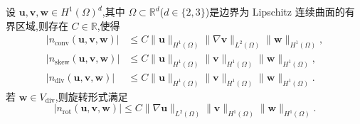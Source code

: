 \begin{lemma}[对流项的估计]\label{lem:steady-ns-convection-estimates-1}
设 $\bm{u},\bm{v},\bm{w}\in H^1(\Omega)^d$,其中 $\Omega\subset\mathbb{R}^d$($d\in\{2,3\}$)是边界为 Lipschitz 连续曲面的有界区域,则存在 $C\in\mathbb{R}$,使得
\begin{align}
  |n_{\mathrm{conv}}(\bm{u},\bm{v},\bm{w})|
    &\le C\|\bm{u}\|_{H^1(\Omega)}
       \|\nabla\bm{v}\|_{L^2(\Omega)}
       \|\bm{w}\|_{H^1(\Omega)},
       \label{eq:steady-ns-conv-estimate-29}\\
  |n_{\mathrm{skew}}(\bm{u},\bm{v},\bm{w})|
    &\le C\|\bm{u}\|_{H^1(\Omega)}
       \|\bm{v}\|_{H^1(\Omega)}
       \|\bm{w}\|_{H^1(\Omega)},
       \label{eq:steady-ns-conv-estimate-30}\\
  |n_{\mathrm{div}}(\bm{u},\bm{v},\bm{w})|
    &\le C\|\bm{u}\|_{H^1(\Omega)}
       \|\bm{v}\|_{H^1(\Omega)}
       \|\bm{w}\|_{H^1(\Omega)}.
       \label{eq:steady-ns-conv-estimate-31}
\end{align}
若 $\bm{w}\in V_{\mathrm{div}}$,则旋转形式满足
\begin{equation}\label{eq:steady-ns-rot-estimate-32}
  |n_{\mathrm{rot}}(\bm{u},\bm{v},\bm{w})|
    \le C\|\nabla\bm{u}\|_{L^2(\Omega)}
       \|\bm{v}\|_{H^1(\Omega)}
       \|\bm{w}\|_{H^1(\Omega)}.
\end{equation}
\end{lemma}

